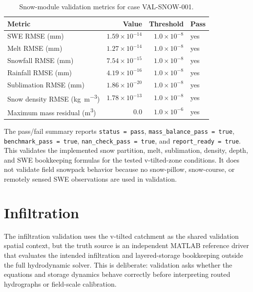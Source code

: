 \documentclass[11pt]{article}
\begin{document}
\begin{table}[htbp]
\centering
\caption{Snow-module validation metrics for case VAL-SNOW-001.}
\label{tab:snow-results}
\begin{tabular}{lrrl}
\toprule
Metric & Value & Threshold & Pass \\
\midrule
SWE RMSE (mm) & $1.59\times10^{-14}$ & $1.0\times10^{-8}$ & yes \\
Melt RMSE (mm) & $1.27\times10^{-14}$ & $1.0\times10^{-8}$ & yes \\
Snowfall RMSE (mm) & $7.54\times10^{-15}$ & $1.0\times10^{-8}$ & yes \\
Rainfall RMSE (mm) & $4.19\times10^{-16}$ & $1.0\times10^{-8}$ & yes \\
Sublimation RMSE (mm) & $1.86\times10^{-20}$ & $1.0\times10^{-8}$ & yes \\
Snow density RMSE (\si{\kilogram\per\cubic\meter}) & $1.78\times10^{-13}$ & $1.0\times10^{-8}$ & yes \\
Maximum mass residual (\si{\cubic\meter}) & $0.0$ & $1.0\times10^{-6}$ & yes \\
\bottomrule
\end{tabular}
\end{table}

The pass/fail summary reports \texttt{status = pass}, \texttt{mass\_balance\_pass = true}, \texttt{benchmark\_pass = true}, \texttt{nan\_check\_pass = true}, and \texttt{report\_ready = true}. This validates the implemented snow partition, melt, sublimation, density, depth, and SWE bookkeeping formulas for the tested v-tilted-zone conditions. It does not validate field snowpack behavior because no snow-pillow, snow-course, or remotely sensed SWE observations are used in validation.

\section{Infiltration}
\label{sec:infiltration}
The infiltration validation uses the v-tilted catchment as the shared validation spatial context, but the truth source is an independent MATLAB reference driver that evaluates the intended infiltration and layered-storage bookkeeping outside the full hydrodynamic solver. This is deliberate: validation asks whether the equations and storage dynamics behave correctly before interpreting routed hydrographs or field-scale calibration.
\end{document}
